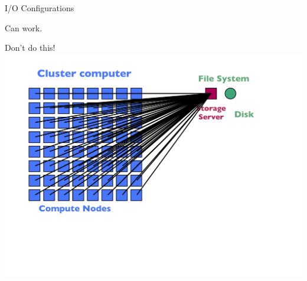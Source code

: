 \begin{frame}{I/O Configurations}
\begin{minipage}{0.32\textwidth}
\begin{block}{Can work.}
    \end{block}
  \end{minipage}\hspace{1ex}
  \begin{minipage}{0.32\textwidth}
    \begin{block}{Don't do this!}
      \includegraphics[trim=0 120 30 40,clip,width=1\textwidth]{../common/pics/hardware/ParallelHardware16.pdf}
    \end{block}
  \end{minipage}
\end{frame}


